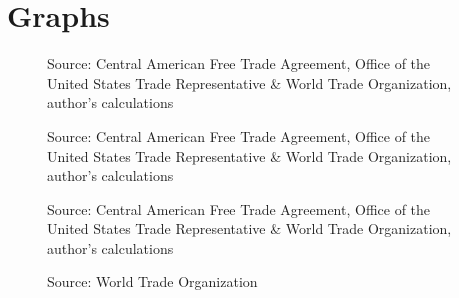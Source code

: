 \chapter{Graphs}
\label{sec:Graphs}

\begin{figure}[H]
 
\caption{\label{fig:Graph1}}
Source: Central American Free Trade Agreement, Office of the United States Trade Representative \&
World Trade Organization, author's calculations
\end{figure}

\begin{figure}[H]

\caption{\label{fig:Graph2}}
Source: Central American Free Trade Agreement, Office of the United States Trade Representative \&
World Trade Organization, author's calculations
\end{figure}

\begin{figure}[H]

\caption{\label{fig:Graph3}}
Source: Central American Free Trade Agreement, Office of the United States Trade Representative \&
World Trade Organization, author's calculations
\end{figure}

\begin{figure}[H]

\caption{\label{fig:Graph4}}
Source: World Trade Organization
\end{figure}

